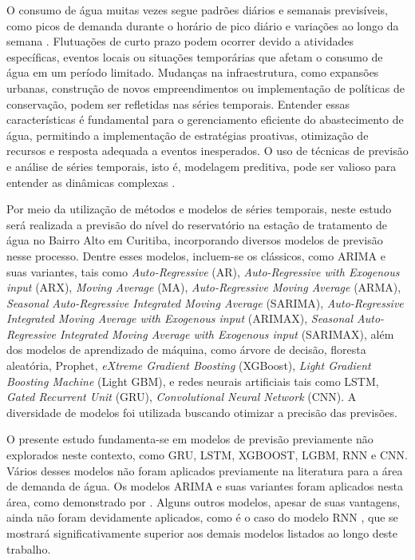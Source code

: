 O consumo de água muitas vezes segue padrões diários e semanais previsíveis, como picos de demanda durante o horário de pico diário e variações ao longo da semana \cite{SIEGEL2020103481}. Flutuações de curto prazo podem ocorrer devido a atividades específicas, eventos locais ou situações temporárias que afetam o consumo de água em um período limitado. Mudanças na infraestrutura, como expansões urbanas, construção de novos empreendimentos ou implementação de políticas de conservação, podem ser refletidas nas séries temporais. Entender essas características é fundamental para o gerenciamento eficiente do abastecimento de água, permitindo a implementação de estratégias proativas, otimização de recursos e resposta adequada a eventos inesperados. O uso de técnicas de previsão e análise de séries temporais, isto é, modelagem preditiva, pode ser valioso para entender as dinâmicas complexas \cite{UCCASTILLO2023105788}.

Por meio da utilização de métodos e modelos de séries temporais, neste estudo será realizada a previsão do nível do reservatório na estação de tratamento de água no Bairro Alto em Curitiba, incorporando diversos modelos de previsão nesse processo. Dentre esses modelos, incluem-se os clássicos, como ARIMA e suas variantes, tais como \textit{Auto-Regressive} (AR), \textit{Auto-Regressive with Exogenous input} (ARX), \textit{Moving Average} (MA), \textit{Auto-Regressive Moving Average} (ARMA), \textit{Seasonal Auto-Regressive Integrated Moving Average} (SARIMA), \textit{Auto-Regressive Integrated Moving Average with Exogenous input} (ARIMAX), \textit{Seasonal Auto-Regressive Integrated Moving Average with Exogenous input} (SARIMAX), além dos modelos de aprendizado de máquina, como árvore de decisão, floresta aleatória, Prophet, \textit{eXtreme Gradient Boosting} (XGBoost), \textit{Light Gradient Boosting Machine} (Light GBM), e redes neurais artificiais tais como LSTM, \textit{Gated Recurrent Unit} (GRU), \textit{Convolutional Neural Network} (CNN). A diversidade de modelos foi utilizada buscando otimizar a precisão das previsões.

O presente estudo fundamenta-se em modelos de previsão previamente não explorados neste contexto, como GRU, LSTM, XGBOOST, LGBM, RNN e CNN. Vários desses modelos não foram aplicados previamente na literatura para a área de demanda de água. Os modelos ARIMA e suas variantes foram aplicados nesta área, como demonstrado por \cite{2-s2.0-85069459067, 2-s2.0-85099424908}. Alguns outros modelos, apesar de suas vantagens, ainda não foram devidamente aplicados, como é o caso do modelo RNN \cite{2-s2.0-85067419084}, que se mostrará significativamente superior aos demais modelos listados ao longo deste trabalho.

